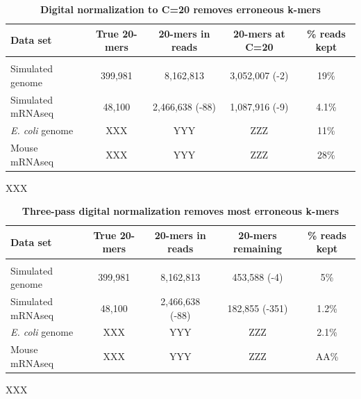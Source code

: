 \documentclass[10pt,draft]{article}
\begin{document}
\begin{table}[!ht]
\caption{
\bf{Digital normalization to C=20 removes erroneous k-mers}}
\begin{tabular}{|l|c|c|c|c|}
Data set & True 20-mers & 20-mers in reads & 20-mers at C=20 & \% reads kept\\
\hline \\
Simulated genome & 399,981 & 8,162,813 & 3,052,007 (-2) & 19\% \\
Simulated mRNAseq & 48,100 & 2,466,638 (-88) & 1,087,916 (-9) & 4.1\% \\
{\em E. coli} genome & XXX & YYY & ZZZ & 11\% \\
Mouse mRNAseq & XXX & YYY & ZZZ & 28\% \\
\end{tabular}
\begin{flushleft} XXX
\end{flushleft}
\label{tab:normC20}
\end{table}

\begin{table}[!ht]
\caption{
\bf{Three-pass digital normalization removes most erroneous k-mers}}
\begin{tabular}{|l|c|c|c|c|}
Data set & True 20-mers & 20-mers in reads & 20-mers remaining & \% reads kept\\
\hline \\
Simulated genome & 399,981 & 8,162,813 & 453,588 (-4) & 5\% \\
Simulated mRNAseq & 48,100 & 2,466,638 (-88) & 182,855 (-351) & 1.2\% \\
{\em E. coli} genome & XXX & YYY & ZZZ & 2.1\% \\
Mouse mRNAseq & XXX & YYY & ZZZ & AA\% \\
\end{tabular}
\begin{flushleft} XXX
\end{flushleft}
\label{tab:normC5}
\end{table}
\end{document}

